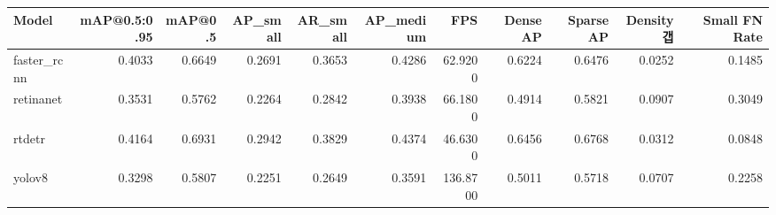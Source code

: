 \begin{tabular}{lrrrrrrrrrr}
\toprule
Model & mAP@0.5:0.95 & mAP@0.5 & AP_small & AR_small & AP_medium & FPS & Dense AP & Sparse AP & Density 갭 & Small FN Rate \\
\midrule
faster_rcnn & 0.4033 & 0.6649 & 0.2691 & 0.3653 & 0.4286 & 62.9200 & 0.6224 & 0.6476 & 0.0252 & 0.1485 \\
retinanet & 0.3531 & 0.5762 & 0.2264 & 0.2842 & 0.3938 & 66.1800 & 0.4914 & 0.5821 & 0.0907 & 0.3049 \\
rtdetr & 0.4164 & 0.6931 & 0.2942 & 0.3829 & 0.4374 & 46.6300 & 0.6456 & 0.6768 & 0.0312 & 0.0848 \\
yolov8 & 0.3298 & 0.5807 & 0.2251 & 0.2649 & 0.3591 & 136.8700 & 0.5011 & 0.5718 & 0.0707 & 0.2258 \\
\bottomrule
\end{tabular}
